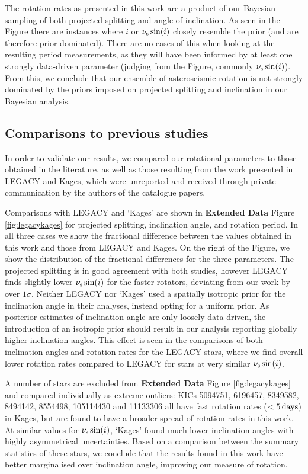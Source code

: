 The rotation rates as presented in this work are a product of our Bayesian sampling of both projected splitting and angle of inclination. As seen in the Figure there are instances where $i$ or $\nu_{\rm s}\sin(i)$ closely resemble the prior (and are therefore prior-dominated). There are no cases of this when looking at the resulting period measurements, as they will have been informed by at least one strongly data-driven parameter (judging from the Figure, commonly $\nu_{\rm s}\sin(i)$). From this, we conclude that our ensemble of asteroseismic rotation is not strongly dominated by the priors imposed on projected splitting and inclination in our Bayesian analysis.

\subsection{Comparisons to previous studies}\label{ssec:litcomp}
In order to validate our results, we compared our rotational parameters to those obtained in the literature, as well as those resulting from the work presented in LEGACY and Kages, which were unreported and received through private communication by the authors of the catalogue papers.

Comparisons with LEGACY and `Kages' are shown in \textbf{Extended Data} Figure \ref{fig:legacykages} for projected splitting, inclination angle, and rotation period. In all three cases we show the fractional difference between the values obtained in this work and those from LEGACY and Kages. On the right of the Figure, we show the distribution of the fractional differences for the three parameters.
The projected splitting is in good agreement with both studies, however LEGACY finds slightly lower $\nu_{\rm s}\sin(i)$ for the faster rotators, deviating from our work by over $1\sigma$. Neither LEGACY nor `Kages' used a spatially isotropic prior for the inclination angle in their analyses, instead opting for a uniform prior. As posterior estimates of inclination angle are only loosely data-driven, the introduction of an isotropic prior should result in our analysis reporting globally higher inclination angles. This effect is seen in the comparisons of both inclination angles and rotation rates for the LEGACY stars, where we find overall lower rotation rates compared to LEGACY for stars at very similar $\nu_{\rm s}\sin(i)$.

A number of stars are excluded from \textbf{Extended Data} Figure \ref{fig:legacykages} and compared individually as extreme outliers: KICs 5094751, 6196457, 8349582, 8494142, 8554498, 105114430 and 11133306 all have fast rotation rates ($<5\, \rm days$) in Kages, but are found to have a broader spread of rotation rates in this work. At similar values for $\nu_{\rm s}\sin(i)$, `Kages' found much lower inclination angles with highly asymmetrical uncertainties. Based on a comparison between the summary statistics of these stars, we conclude that the results found in this work have better marginalised over inclination angle, improving our measure of rotation.

